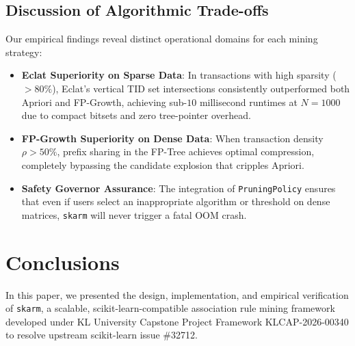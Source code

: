 \documentclass[11pt,a4paper]{article}
\begin{document}
\subsection{Discussion of Algorithmic Trade-offs}
Our empirical findings reveal distinct operational domains for each mining strategy:
\begin{itemize}
    \item \textbf{Eclat Superiority on Sparse Data}: In transactions with high sparsity ($> 80\%$), Eclat's vertical TID set intersections consistently outperformed both Apriori and FP-Growth, achieving sub-$10$ millisecond runtimes at $N = 1000$ due to compact bitsets and zero tree-pointer overhead.
    \item \textbf{FP-Growth Superiority on Dense Data}: When transaction density $\rho > 50\%$, prefix sharing in the FP-Tree achieves optimal compression, completely bypassing the candidate explosion that cripples Apriori.
    \item \textbf{Safety Governor Assurance}: The integration of \texttt{PruningPolicy} ensures that even if users select an inappropriate algorithm or threshold on dense matrices, \texttt{skarm} will never trigger a fatal OOM crash.
\end{itemize}

\vspace{0.7em}

\section{Conclusions}

In this paper, we presented the design, implementation, and empirical verification of \texttt{skarm}, a scalable, scikit-learn-compatible association rule mining framework developed under KL University Capstone Project Framework KLCAP-2026-00340 to resolve upstream scikit-learn issue \#32712. 
\end{document}
